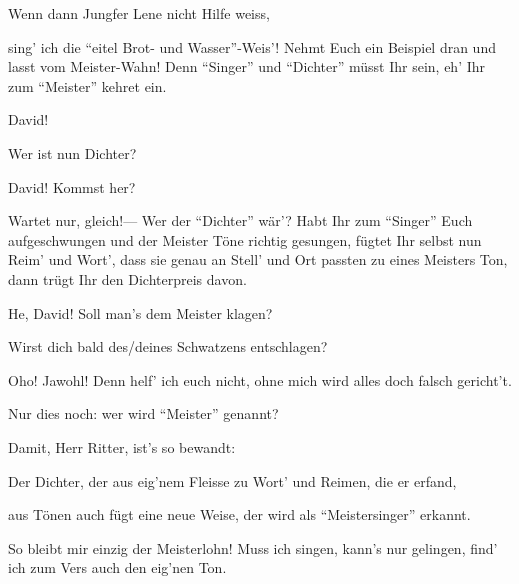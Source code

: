 \begin{drama}

Wenn dann Jungfer Lene nicht Hilfe weiss,


sing' ich die ``eitel Brot- und Wasser''-Weis'!
Nehmt Euch ein Beispiel dran
und lasst vom Meister-Wahn!
Denn ``Singer'' und ``Dichter'' müsst Ihr sein,
eh' Ihr zum ``Meister'' kehret ein.



David!

\Waltherspeaks
Wer ist nun Dichter?


David! Kommst her?

\Davidspeaks


Wartet nur, gleich!---
Wer der ``Dichter'' wär'?
Habt Ihr zum ``Singer'' Euch aufgeschwungen
und der Meister Töne richtig gesungen,
fügtet Ihr selbst nun Reim' und Wort',
dass sie genau an Stell' und Ort
passten zu eines Meisters Ton,
dann trügt Ihr den Dichterpreis davon.


He, David! Soll man's dem Meister klagen?


Wirst dich bald des/deines Schwatzens entschlagen?

\Davidspeaks

Oho! Jawohl! Denn helf' ich euch nicht,
ohne mich wird alles doch falsch gericht't.

\Waltherspeaks


Nur dies noch:
wer wird ``Meister'' genannt?

\Davidspeaks


Damit, Herr Ritter, ist's so bewandt:

Der Dichter, der aus eig'nem Fleisse
zu Wort' und Reimen, die er erfand,


aus Tönen auch fügt eine neue Weise,
der wird als ``Meistersinger'' erkannt.

\Waltherspeaks
So bleibt mir einzig der Meisterlohn!
Muss ich singen,
kann's nur gelingen,
find' ich zum Vers auch den eig'nen Ton.


\end{drama}
